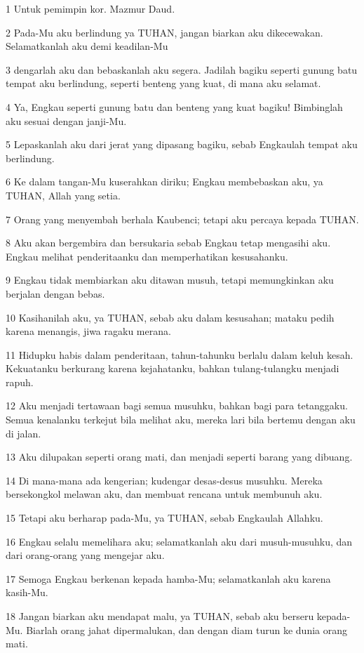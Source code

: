 \par 1 Untuk pemimpin kor. Mazmur Daud.
\par 2 Pada-Mu aku berlindung ya TUHAN, jangan biarkan aku dikecewakan. Selamatkanlah aku demi keadilan-Mu
\par 3 dengarlah aku dan bebaskanlah aku segera. Jadilah bagiku seperti gunung batu tempat aku berlindung, seperti benteng yang kuat, di mana aku selamat.
\par 4 Ya, Engkau seperti gunung batu dan benteng yang kuat bagiku! Bimbinglah aku sesuai dengan janji-Mu.
\par 5 Lepaskanlah aku dari jerat yang dipasang bagiku, sebab Engkaulah tempat aku berlindung.
\par 6 Ke dalam tangan-Mu kuserahkan diriku; Engkau membebaskan aku, ya TUHAN, Allah yang setia.
\par 7 Orang yang menyembah berhala Kaubenci; tetapi aku percaya kepada TUHAN.
\par 8 Aku akan bergembira dan bersukaria sebab Engkau tetap mengasihi aku. Engkau melihat penderitaanku dan memperhatikan kesusahanku.
\par 9 Engkau tidak membiarkan aku ditawan musuh, tetapi memungkinkan aku berjalan dengan bebas.
\par 10 Kasihanilah aku, ya TUHAN, sebab aku dalam kesusahan; mataku pedih karena menangis, jiwa ragaku merana.
\par 11 Hidupku habis dalam penderitaan, tahun-tahunku berlalu dalam keluh kesah. Kekuatanku berkurang karena kejahatanku, bahkan tulang-tulangku menjadi rapuh.
\par 12 Aku menjadi tertawaan bagi semua musuhku, bahkan bagi para tetanggaku. Semua kenalanku terkejut bila melihat aku, mereka lari bila bertemu dengan aku di jalan.
\par 13 Aku dilupakan seperti orang mati, dan menjadi seperti barang yang dibuang.
\par 14 Di mana-mana ada kengerian; kudengar desas-desus musuhku. Mereka bersekongkol melawan aku, dan membuat rencana untuk membunuh aku.
\par 15 Tetapi aku berharap pada-Mu, ya TUHAN, sebab Engkaulah Allahku.
\par 16 Engkau selalu memelihara aku; selamatkanlah aku dari musuh-musuhku, dan dari orang-orang yang mengejar aku.
\par 17 Semoga Engkau berkenan kepada hamba-Mu; selamatkanlah aku karena kasih-Mu.
\par 18 Jangan biarkan aku mendapat malu, ya TUHAN, sebab aku berseru kepada-Mu. Biarlah orang jahat dipermalukan, dan dengan diam turun ke dunia orang mati.

